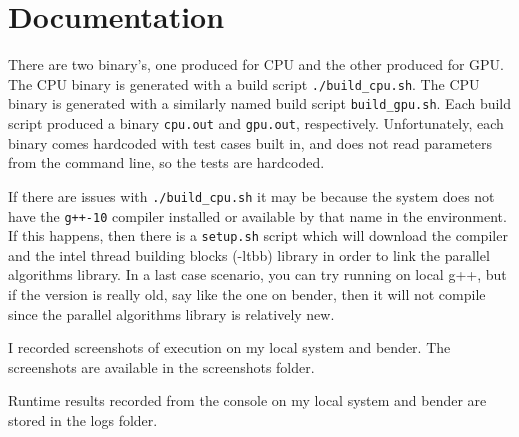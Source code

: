 \documentclass{article}
\begin{document}
\section{Documentation}
There are two binary's, one produced for CPU and the other produced for GPU. The CPU binary is generated with a build script \texttt{./build\_cpu.sh}. The CPU binary is generated with a similarly named build script \texttt{build\_gpu.sh}. Each build script produced a binary \texttt{cpu.out} and \texttt{gpu.out}, respectively. Unfortunately, each binary comes hardcoded with test cases built in, and does not read parameters from the command line, so the tests are hardcoded. 

If there are issues with \texttt{./build\_cpu.sh} it may be because the system does not have the \texttt{g++-10} compiler installed or available by that name in the environment. If this happens, then there is a \texttt{setup.sh} script which will download the compiler and the intel thread building blocks (-ltbb) library in order to link the parallel algorithms library. In a last case scenario, you can try running on local g++, but if the version is really old, say like the one on bender, then it will not compile since the parallel algorithms library is relatively new. 

I recorded screenshots of execution on my local system and bender. The screenshots are available in the screenshots folder. 

Runtime results recorded from the console on my local system and bender are stored in the logs folder.
\end{document}
